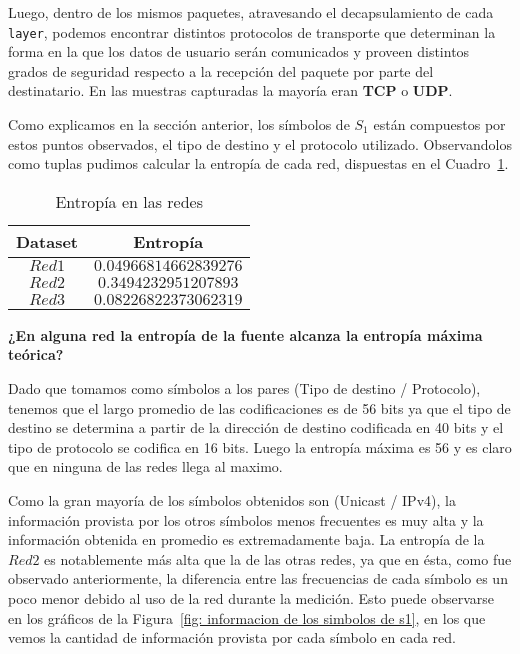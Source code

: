 Luego, dentro de los mismos paquetes, atravesando el decapsulamiento de cada \texttt{layer}, podemos encontrar distintos protocolos de transporte que determinan la forma en la que los datos de usuario serán comunicados y proveen distintos grados de seguridad respecto a la recepción del paquete por parte del destinatario. En las muestras capturadas la mayoría eran \textbf{TCP} o \textbf{UDP}.

\vspace{4mm}

Como explicamos en la sección anterior, los símbolos de $S_{1}$ están compuestos por estos puntos observados, el tipo de destino y el protocolo utilizado. Observandolos como tuplas pudimos calcular la entropía de cada red, dispuestas en el Cuadro~\ref{tab: entropía}.

\begin{table}[H]
\begin{center}
    \begin{tabular}{||c c||} 
        \hline
        Dataset & Entropía \\ [0.5ex] 
        \hline\hline
        $Red 1$ & $0.04966814662839276$ \\ 
        \hline
        $Red 2$ & $0.3494232951207893$ \\
        \hline
        $Red 3$ & $0.08226822373062319$ \\ [1ex] 
        \hline
    \end{tabular}
    \caption{Entropía en las redes}
    \label{tab: entropía}
\end{center}
\end{table}

\textbf{¿En alguna red la entropía de la fuente alcanza la entropía máxima teórica?}

Dado que tomamos como símbolos a los pares (Tipo de destino / Protocolo), tenemos que el largo promedio de las codificaciones es de 56 bits ya que el tipo de destino se determina a partir de la dirección de destino codificada en 40 bits y el tipo de protocolo se codifica en 16 bits. Luego la entropía máxima es 56 y es claro que en ninguna de las redes llega al maximo. 

Como la gran mayoría de los símbolos obtenidos son (Unicast / IPv4), la información provista por los otros símbolos menos frecuentes es muy alta y la información obtenida en promedio es extremadamente baja. La entropía de la $Red2$ es notablemente más alta que la de las otras redes, ya que en ésta, como fue observado anteriormente, la diferencia entre las frecuencias de cada símbolo es un poco menor debido al uso de la red durante la medición. Esto puede observarse en los gráficos de la Figura~\ref{fig: informacion de los simbolos de s1}, en los que vemos la cantidad de información provista por cada símbolo en cada red.

